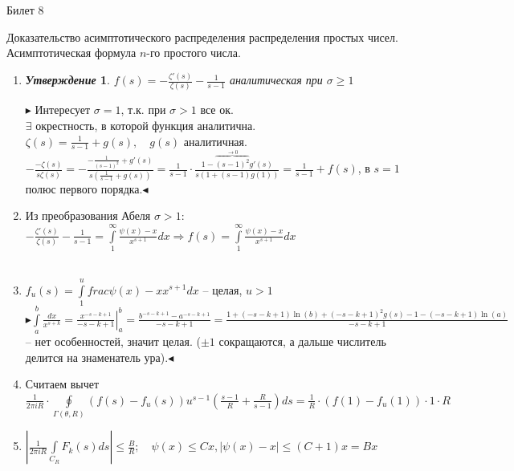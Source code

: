 \documentclass[a4paper,12pt]{article}
\newtheorem{utv}{\textit{Утверждение}}
\newcommand{\TE}{\theta}
\newcommand{\SI}{\psi}
\newcommand{\q}{\quad}
\newcommand{\pb}{\blacktriangleright}
\newcommand{\pe}{\blacktriangleleft}
\newcommand{\Ra}{\Rightarrow}
\newcommand{\IL}{\int\limits}
\newcommand{\os}{\left(}
\newcommand{\cs}{\right)}
\begin{document}
\newpage
\begin{mybox2}{\hypertarget{bil8}{Билет 8}}

\begin{formbox}{}
Доказательство асимптотического распределения распределения простых чисел. Асимптотическая формула $n$-го простого числа.
\end{formbox}
\begin{enumerate}
\item

\begin{formbox}{}
\begin{utv} $f(s) = -\frac{\zeta'(s)}{\zeta(s)} - \frac{1}{s-1} $ аналитическая при $\sigma \ge 1$
\end{utv}
\end{formbox}
$\pb$ Интересует $\sigma = 1$, т.к. при $\sigma > 1$ все ок.\\
$\exists$ окрестность, в которой функция аналитична.\\
$\zeta(s) = \frac{1}{s-1} + g(s),\q g(s)$  аналитичная.\\
$-\frac{-\zeta(s)}{s\zeta(s)} = -\frac{-\frac{1}{(s-1)^2} + g'(s)}{s\os \frac{1}{s-1} + g(s) \cs} = \frac{1}{s-1} \cdot \frac{1 - \overbrace{(s-1)^2}^{\to 0} g'(s)}{s (1 + (s-1)g(1))} = \frac{1}{s-1} + f(s)$, в $s = 1$ полюс первого порядка.$\pe$
\item Из преобразования Абеля $\sigma > 1$: $-\frac{\zeta'(s)}{\zeta(s)} - \frac{1}{s-1} = \IL_1^\infty\frac{\SI(x) - x}{x^{s+1}}dx\Ra f(s) = \IL_1^\infty\frac{\SI(x) - x}{x^{s+1}}dx $\\\q\\
\item $f_u(s) = \IL_1^u frac{\SI(x) - x}{x^{s+1}}dx$ -- целая, $u > 1$\\
$\pb \IL_a^b \frac{dx}{x^{s+k}} = \left.\frac{x^{-s-k+1}}{-s-k+1} \right|_a^b = \frac{b^{-s-k+1} - a^{-s-k+1}}{-s-k+1} = \frac{1 + (-s-k+1)\ln(b) + (-s-k+1)^2g(s) -1 - (-s-k+1)\ln(a)}{-s-k+1} $ -- нет особенностей, значит целая. ($\pm 1 $ сокращаются, а дальше числитель делится на знаменатель ура).$\pe$
\item Считаем вычет \\$\frac{1}{2\pi i R}\cdot \oint\limits_{\Gamma(\TE,R)}(f(s) - f_u(s)) u^{s-1}\os \frac{s-1}{R} + \frac{R}{s-1}  \cs ds = \frac{1}{R}\cdot (f(1) - f_u(1)) \cdot 1 \cdot R $
\item $\left| \frac{1}{2\pi i R} \IL_{C_R}F_k(s)ds \right| \le \frac{B}{R};\q\SI(x) \le Cx, |\SI(x) - x|\le (C+1)x = Bx$\\

\end{enumerate}
\end{mybox2}
\end{document}
